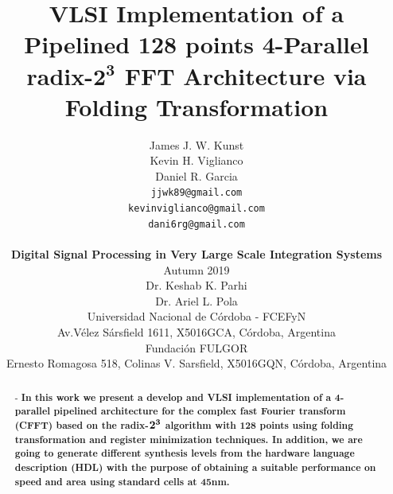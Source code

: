 \documentclass[journal,comsoc]{IEEEtran}
\begin{document}
\title{
\huge \bf VLSI Implementation of a Pipelined 128 points 4-Parallel radix-$\mathbf{2^3}$ FFT Architecture via Folding Transformation\\
}
\author{
\begin{minipage}{0.4\linewidth}
	\raggedleft
	James J. W. Kunst\\
	Kevin H. Viglianco\\
	Daniel R. Garcia
\end{minipage}
\begin{minipage}{0.4\linewidth}
	\raggedright	
	{\tt\small jjwk89@gmail.com}\\
	{\tt\small kevinviglianco@gmail.com}\\	
	{\tt\small dani6rg@gmail.com}			
\end{minipage}			
\\		
[0.5cm]
{\large \bf Digital Signal Processing in Very Large Scale Integration Systems}\\
[0.5cm]
Autumn 2019\\
[0.5cm]
Dr. Keshab K. Parhi	\\
Dr. Ariel L. Pola	\\
[0.5cm]
Universidad Nacional de Córdoba - FCEFyN\\
Av.Vélez Sársfield 1611, X5016GCA, C\'ordoba, Argentina\\
[0.5cm]
Fundación FULGOR\\
Ernesto Romagosa 518, Colinas V. Sarsfield, X5016GQN, Córdoba, Argentina%
}
\maketitle


\begin{abstract} - \bf In this work we present a develop and VLSI implementation of a 4-parallel pipelined architecture for the complex fast Fourier transform (CFFT) based on the radix-$\bf 2^3$ algorithm with 128 points using folding transformation and register minimization techniques. In addition, we are going to generate different synthesis levels from the hardware language description (HDL) with the purpose of obtaining a suitable performance on speed and area using standard cells at 45nm. %
\end{abstract}
\end{document}

